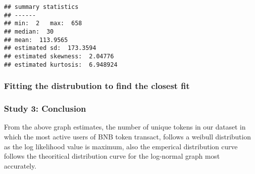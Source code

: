 \documentclass[]{article}
\newenvironment{Shaded}{\begin{snugshade}}{\end{snugshade}}
\newcommand{\KeywordTok}[1]{\textcolor[rgb]{0.13,0.29,0.53}{\textbf{#1}}}
\newcommand{\DataTypeTok}[1]{\textcolor[rgb]{0.13,0.29,0.53}{#1}}
\newcommand{\StringTok}[1]{\textcolor[rgb]{0.31,0.60,0.02}{#1}}
\newcommand{\CommentTok}[1]{\textcolor[rgb]{0.56,0.35,0.01}{\textit{#1}}}
\newcommand{\OperatorTok}[1]{\textcolor[rgb]{0.81,0.36,0.00}{\textbf{#1}}}
\newcommand{\NormalTok}[1]{#1}
\begin{document}
\begin{verbatim}
## summary statistics
## ------
## min:  2   max:  658 
## median:  30 
## mean:  113.9565 
## estimated sd:  173.3594 
## estimated skewness:  2.04776 
## estimated kurtosis:  6.948924
\end{verbatim}

\subsubsection{Fitting the distrubution to find the closest
fit}\label{fitting-the-distrubution-to-find-the-closest-fit}

\begin{Shaded}
\end{Shaded}

\subsubsection{Study 3: Conclusion}\label{study-3-conclusion}

From the above graph estimates, the number of unique tokens in our
dataset in which the most active users of BNB token transact, follows a
weibull distribution as the log likelihood value is maximum, also the
emperical distribution curve follows the theoritical distribution curve
for the log-normal graph most accurately.
\end{document}
